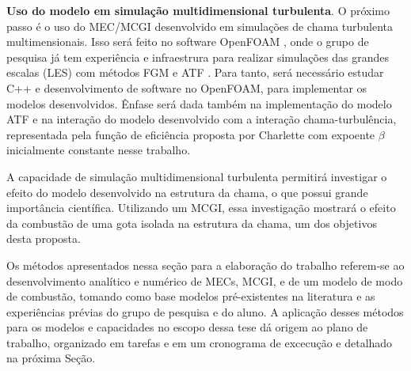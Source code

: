 
\textbf{Uso do modelo em simulação multidimensional turbulenta}.
O próximo passo é o uso do MEC/MCGI desenvolvido em simulações de chama turbulenta multimensionais.
Isso será feito no software OpenFOAM \cite{JasakOpenFOAM}, onde o grupo de pesquisa já tem experiência e infraestrura para realizar simulações das grandes escalas (LES) com métodos FGM e ATF \cite{SacomanoF2017PhD,SacomanoF2017CF,SacomanoF2020CF}.
Para tanto, será necessário estudar C++ e desenvolvimento de software no OpenFOAM, para implementar os modelos desenvolvidos.
Ênfase será dada também na implementação do modelo ATF e na interação do modelo desenvolvido com a interação chama-turbulência, representada pela função de eficiência proposta por Charlette \cite{CharletteF2002} com expoente $\beta$ inicialmente constante nesse trabalho. 

A capacidade de simulação multidimensional turbulenta permitirá investigar o efeito do modelo desenvolvido na estrutura da chama, o que possui grande importância científica.
Utilizando um MCGI, essa investigação mostrará o efeito da combustão de uma gota isolada na estrutura da chama, um dos objetivos desta proposta.

Os métodos apresentados nessa seção para a elaboração do trabalho  referem-se ao desenvolvimento analítico e numérico de MECs, MCGI, e de um modelo de modo de combustão, tomando como base modelos pré-existentes na literatura e as experiências prévias do grupo de pesquisa e do aluno.
A aplicação desses métodos para os modelos e capacidades no escopo dessa tese dá origem ao plano de trabalho, organizado em tarefas e em um cronograma de excecução e detalhado na próxima Seção.


